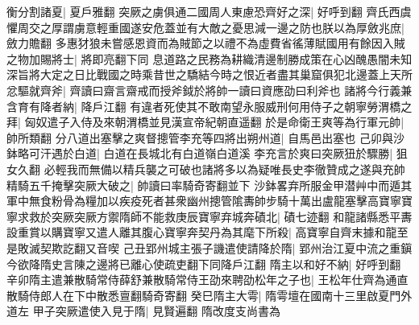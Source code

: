 衡分割諸夏|{
	夏戶雅翻}
突厥之虜俱通二國周人東慮恐齊好之深|{
	好呼到翻}
齊氏西虞懼周交之厚謂虜意輕重國遂安危蓋並有大敵之憂思減一邊之防也朕以為厚斂兆庶|{
	斂力贍翻}
多惠犲狼未嘗感恩資而為賊節之以禮不為虛費省徭薄賦國用有餘因入賊之物加賜將士|{
	將即亮翻下同}
息道路之民務為耕織清邊制勝成策在心凶醜愚闇未知深旨將大定之日比戰國之時乘昔世之驕結今時之恨近者盡其巢窟俱犯北邊蓋上天所忿驅就齊斧|{
	齊讀曰齋言齋戒而授斧鉞於將帥一讀曰資應劭曰利斧也}
諸將今行義兼含育有降者納|{
	降戶江翻}
有違者死使其不敢南望永服威刑何用侍子之朝寧勞渭橋之拜|{
	匈奴遣子入侍及來朝渭橋並見漢宣帝紀朝直遥翻}
於是命衛王爽等為行軍元帥|{
	帥所類翻}
分八道出塞擊之爽督摠管李充等四將出朔州道|{
	自馬邑出塞也}
己卯與沙鉢略可汗遇於白道|{
	白道在長城北有白道嶺白道溪}
李充言於爽曰突厥狃於驟勝|{
	狙女久翻}
必輕我而無備以精兵襲之可破也諸將多以為疑唯長史李徹贊成之遂與充帥精騎五千掩擊突厥大破之|{
	帥讀曰率騎奇寄翻並下}
沙鉢畧弃所服金甲潜艸中而遁其軍中無食粉骨為糧加以疾疫死者甚衆幽州摠管隂夀帥步騎十萬出盧龍塞擊高寶寧寶寧求救於突厥突厥方禦隋師不能救庚辰寶寧弃城奔磧北|{
	磧七迹翻}
和龍諸縣悉平夀設重賞以購寶寧又遣人離其腹心寶寧奔契丹為其麾下所殺|{
	高寶寧自齊末據和龍至是敗滅契欺訖翻又音喫}
己丑郢州城主張子譏遣使請降於隋|{
	郢州治江夏中流之重鎭今欲降隋史言陳之邊將已離心使疏吏翻下同降戶江翻}
隋主以和好不納|{
	好呼到翻}
辛卯隋主遣兼散騎常侍薛舒兼散騎常侍王劭來聘劭松年之子也|{
	王松年仕齊為通直散騎侍郎人在下中散悉亶翻騎奇寄翻}
癸巳隋主大雩|{
	隋雩壇在國南十三里啟夏門外道左}
甲子突厥遣使入見于隋|{
	見賢遍翻}
隋改度支尚書為

